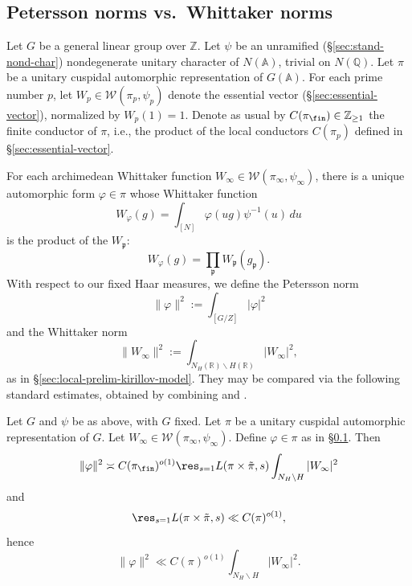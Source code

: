 \subsection{Petersson norms vs.\ Whittaker norms}\label{sec:norms-cusp-forms}
Let $G$ be a general linear group over $\mathbb{Z}$.  Let $\psi$ be an unramified (\S\ref{sec:stand-nond-char}) nondegenerate unitary character of $N(\mathbb{A})$, trivial on $N(\mathbb{Q})$.  Let $\pi$ be a unitary cuspidal automorphic representation of $G(\mathbb{A})$.  For each prime number $p$, let $W_p \in \mathcal{W}(\pi_p, \psi_p)$ denote the essential vector (\S\ref{sec:essential-vector}), normalized by $W_p(1) = 1$.  Denote as usual by $C(\pi_{\fin}) \in \mathbb{Z}_{\geq 1}$ the finite conductor of $\pi$, i.e., the product of the local conductors $C(\pi_p)$ defined in \S\ref{sec:essential-vector}.

For each archimedean Whittaker function $W_\infty \in \mathcal{W}(\pi_\infty, \psi_\infty)$, there is a unique automorphic form $\varphi \in \pi$ whose Whittaker function
\begin{equation*}
  W_\varphi(g) = \int_{[N]} \varphi(u g) \psi^{-1}(u) \, d u
\end{equation*}
is the product of the $W_\mathfrak{p}$:
\begin{equation*}
  W_{\varphi}(g) = \prod_{\mathfrak{p}} W_{\mathfrak{p}}(g_\mathfrak{p}).
\end{equation*}
With respect to our fixed Haar measures, we define the Petersson norm
\begin{equation*}
  \|\varphi \|^2 := \int_{[G/Z]} |\varphi|^2
\end{equation*}
and the Whittaker norm
\begin{equation*}
  \|W_\infty \|^2 := \int_{N_H(\mathbb{R}) \backslash H(\mathbb{R})} |W_\infty|^2,
\end{equation*}
as in \S\ref{sec:local-prelim-kirillov-model}.  They may be compared via the following standard estimates, obtained by combining \cite[\S7]{MR2200849} and \cite[\S1.3]{MR2595006}.

\begin{lemma}\label{lem:nonstandard-norm-whittaker}
  Let $G$ and $\psi$ be as above, with $G$ fixed.  Let $\pi$ be a unitary cuspidal automorphic representation of $G$.  Let $W_\infty \in \mathcal{W}(\pi_\infty, \psi_\infty)$.  Define $\varphi \in \pi$ as in \S\ref{sec:norms-cusp-forms}.  Then
  \begin{equation*}
    \|\varphi \|^2
    \asymp  C(\pi_{\fin})^{o(1)}
    \res_{s=1}L(\pi \times \tilde{\pi}, s)
    \int_{N_H \backslash H}
    |W_\infty|^2
  \end{equation*}
  and
  \begin{equation*}
    \res_{s=1}L(\pi \times \tilde{\pi}, s) \ll C(\pi)^{o(1)},
  \end{equation*}
  hence
  \begin{equation*}
    \|\varphi \|^2
    \ll C(\pi) ^{o(1)}
    \int_{N_H \backslash H}
    |W_\infty|^2.
  \end{equation*}
\end{lemma}


